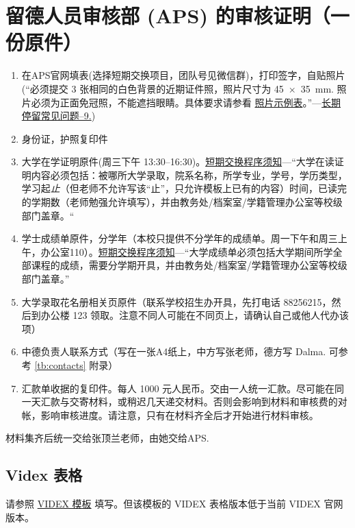 \documentclass[final]{book}
\begin{document}
\section{留德人员审核部 (APS) 的审核证明（一份原件）}
\begin{enumerate}
  \item 在APS官网填表(选择短期交换项目，团队号见微信群)，打印签字，自贴照片(“必须提交 3 张相同的白色背景的近期证件照，照片尺寸为 \SI{45x35}{\mm}. 照片必须为正面免冠照，不能遮挡眼睛。具体要求请参看 \href{https://china.diplo.de/blob/1090226/8b25f160e56c0465aa9b5d5d19f89c4f/pdf-fotomustertafel-data.pdf}{照片示例表}。”---\href{https://china.diplo.de/cn-zh/service/visa-einreise/faq-national-visa/1434978}{长期停留常见问题--9.})
  \item 身份证，护照复印件
  \item 大学在学证明原件(周三下午 13:30--16:30)。\href{https://www.aps.org.cn/wp-content/uploads/260_merkblatt_verfahren_austausch_chn.pdf}{短期交换程序须知}---“大学在读证明内容必须包括：被哪所大学录取，院系名称，所学专业，学号，学历类型，学习起\emph{止}（但老师不允许写该“止”，只允许模板上已有的内容）时间，已读完的学期数（老师勉强允许填写），并由教务处/档案室/学籍管理办公室等校级部门盖章。“
  \item 学士成绩单原件，分学年（本校只提供不分学年的成绩单。周一下午和周三上午，办公室110）。\href{https://www.aps.org.cn/wp-content/uploads/260_merkblatt_verfahren_austausch_chn.pdf}{短期交换程序须知}---“大学成绩单必须包括大学期间所学全部课程的成绩，需要分学期开具，并由教务处/档案室/学籍管理办公室等校级部门盖章。”
  \item 大学录取花名册相关页原件（联系学校招生办开具，先打电话 88256215，然后到办公楼 123 领取。注意不同人可能在不同页上，请确认自己或他人代办该项）
  \item 中德负责人联系方式（写在一张A4纸上，中方写张老师，德方写 Dalma. 可参考 \ref{tb:contacts} 附录）
  \item 汇款单收据的复印件。每人 1000 元人民币。交由一人统一汇款。尽可能在同一天汇款与交寄材料，或稍迟几天递交材料。否则会影响到材料和审核费的对帐，影响审核进度。请注意，只有在材料齐全后才开始进行材料审核。
\end{enumerate}
材料集齐后统一交给张顶兰老师，由她交给APS.

\subsection{Videx 表格}
请参照 \href{https://www.aps.org.cn/wp-content/uploads/Beispiel-Videx.pdf}{VIDEX 模板} 填写。但该模板的 VIDEX 表格版本低于当前 VIDEX 官网版本。
\end{document}

